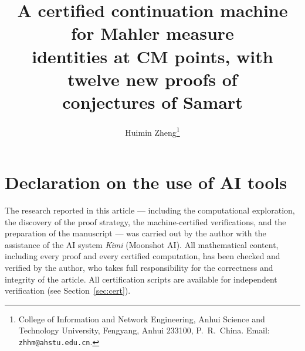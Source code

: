 \documentclass[11pt]{article}
\title{A certified continuation machine for Mahler measure\\
identities at CM points, with twelve new proofs of\\
conjectures of Samart}
\author{Huimin Zheng\thanks{%
College of Information and Network Engineering,
Anhui Science and Technology University,
Fengyang, Anhui 233100, P.~R.~China.
Email: \texttt{zhhm@ahstu.edu.cn}.}}
\date{}
\theoremstyle{definition}
\theoremstyle{remark}
\begin{document}
\maketitle

\section*{Declaration on the use of AI tools}
The research reported in this article --- including the computational
exploration, the discovery of the proof strategy, the machine-certified
verifications, and the preparation of the manuscript --- was carried out
by the author with the assistance of the AI system \emph{Kimi}
(Moonshot AI). All mathematical content, including every proof and
every certified computation, has been checked and verified by the
author, who takes full responsibility for the correctness and integrity
of the article. All certification scripts are available for independent
verification (see Section~\ref{sec:cert}).
\end{document}
